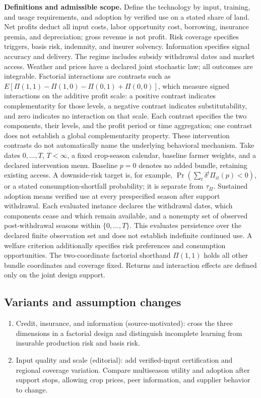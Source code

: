 \documentclass[11pt,a4paper]{article}
\begin{document}
\textbf{Definitions and admissible scope.} Define the technology by input, training, and usage requirements, and adoption by verified use on a stated share of land. Net profits deduct all input costs, labor opportunity cost, borrowing, insurance premia, and depreciation; gross revenue is not profit. Risk coverage specifies triggers, basis risk, indemnity, and insurer solvency. Information specifies signal accuracy and delivery. The regime includes subsidy withdrawal dates and market access. Weather and prices have a declared joint stochastic law; all outcomes are integrable. Factorial interactions are contrasts such as \(E[\Pi(1,1)-\Pi(1,0)-\Pi(0,1)+\Pi(0,0)]\), which measure signed interactions on the additive profit scale: a positive contrast indicates complementarity for those levels, a negative contrast indicates substitutability, and zero indicates no interaction on that scale. Each contrast specifies the two components, their levels, and the profit period or time aggregation; one contrast does not establish a global complementarity property. These intervention contrasts do not automatically name the underlying behavioral mechanism. Take dates \(0,\ldots,T\), \(T<\infty\), a fixed crop-season calendar, baseline farmer weights, and a declared intervention menu. Baseline \(p=0\) denotes no added bundle, retaining existing access. A downside-risk target is, for example, \(\Pr(\sum_t\delta^t\Pi_{it}(p)<0)\), or a stated consumption-shortfall probability; it is separate from \(\tau_\Pi\). Sustained adoption means verified use at every prespecified season after support withdrawal. Each evaluated instance declares the withdrawal dates, which components cease and which remain available, and a nonempty set of observed post-withdrawal seasons within \(\{0,\ldots,T\}\). This evaluates persistence over the declared finite observation set and does not establish indefinite continued use. A welfare criterion additionally specifies risk preferences and consumption opportunities. The two-coordinate factorial shorthand \(\Pi(1,1)\) holds all other bundle coordinates and coverage fixed. Returns and interaction effects are defined only on the joint design support.
\subsection*{Variants and assumption changes}
\begin{enumerate}
\item Credit, insurance, and information (source-motivated): cross the three dimensions in a factorial design and distinguish incomplete learning from insurable production risk and basis risk.
\item Input quality and scale (editorial): add verified-input certification and regional coverage variation. Compare multiseason utility and adoption after support stops, allowing crop prices, peer information, and supplier behavior to change.
\end{enumerate}
\end{document}
